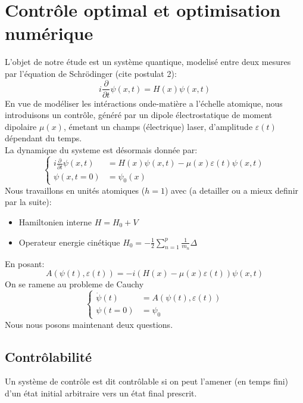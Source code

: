 \section*{Contrôle optimal et optimisation numérique}
L'objet de notre étude est un système quantique, modelisé entre deux mesures par l'équation de Schrödinger (cite postulat 2):
\begin{equation} \label{schrodinger}
i \frac{\partial }{\partial t} \psi (x,t) = H(x)\psi (x,t)
\end{equation}
En vue de modéliser les intéractions onde-matière a l'échelle atomique, nous introduisons un contrôle, généré par un dipole électrostatique de moment dipolaire $\mu (x)$, émetant un champs (électrique) laser, d'amplitude $\varepsilon (t)$ dépendant du temps.\\
La dynamique du systeme est désormais donnée par:
\begin{equation} \label{eq1}
\begin{cases}
i \frac{\partial }{\partial t} \psi (x,t) &= H(x)\psi (x,t)-\mu(x)\varepsilon(t)\psi (x,t) \\
\psi (x,t=0) &= \psi_0(x)
\end{cases}
\end{equation}
Nous travaillons en unités atomiques ($h=1$) avec (a detailler ou a mieux definir par la suite):
\begin{itemize}
	\item Hamiltonien interne $H = H_0 + V$
	\item Operateur energie cinétique $H_0 = -\frac{1}{2} \sum_{n=1}^{p} \frac{1}{m_n} \varDelta$
\end{itemize}
En posant:
\begin{equation}
A(\psi(t),\varepsilon(t))= -i(H(x)-\mu(x)\varepsilon(t))\psi (x,t)
\end{equation}
On se ramene au probleme de Cauchy
\begin{equation} \label{chauchy1}
\begin{cases}
\dot{\psi}(t) &= A(\psi(t),\varepsilon(t)) \\
\psi (t=0) &= \psi_0
\end{cases}
\end{equation}
Nous nous posons maintenant deux questions.
\subsection*{Contrôlabilité}
Un système de contrôle est dit contrôlable si on peut l’amener (en temps fini) d’un état initial arbitraire vers un état final prescrit.
